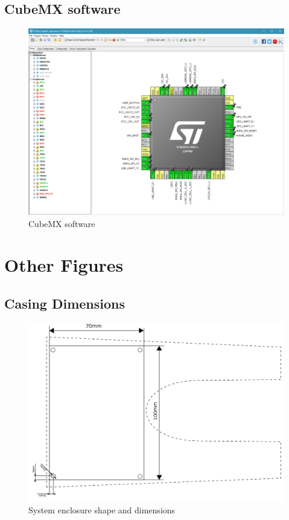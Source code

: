 \subsection{CubeMX software}\label{sec:app:mxc}
\begin{figure}[tbh]
	\centering
    \includegraphics[width=\linewidth]{Figures/MXCube.png}
	\caption{CubeMX software}
	\label{fig:mxc}
\end{figure}

\clearpage
\section{Other Figures}
\subsection{Casing Dimensions}
\begin{figure}[htb]
	\centering
    \includegraphics[width=\linewidth]{Figures/casing_dimensions.png}
	\caption{System enclosure shape and dimensions}
	\label{fig:casdim}
\end{figure}



